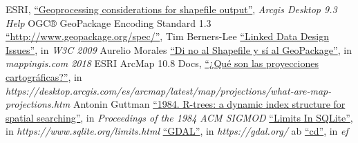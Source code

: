 \begin{thebibliography}{99}
     ESRI, 
        \href{http://webhelp.esri.com/arcgisdesktop/9.3/index.cfm?TopicName=Geoprocessing\%20considerations\%20for\%20shapefile\%20output}{``Geoprocessing considerations for shapefile output''},
        \textit{Arcgis Desktop 9.3 Help}
    OGC® GeoPackage Encoding Standard 1.3
        \href{http://www.geopackage.org/spec/}{``http://www.geopackage.org/spec/''},
     Tim Berners-Lee 
        \href{https://www.w3.org/DesignIssues/LinkedData.html}{``Linked Data Design Issues''},
        in \textit{W3C 2009}
     Aurelio Morales
        \href{https://mappinggis.com/2018/08/di-no-al-shapefile-y-si-al-geopackage/}{``Di no al Shapefile y sí al GeoPackage''},
        in \textit{mappingis.com 2018}
     ESRI ArcMap 10.8 Docs,
        \href{https://desktop.arcgis.com/es/arcmap/latest/map/projections/what-are-map-projections.htm}{``¿Qué son las proyecciones cartográficas?''},
        in \textit{https://desktop.arcgis.com/es/arcmap/latest/map/projections/what-are-map-projections.htm}
     Antonin Guttman
        \href{https://dl.acm.org/doi/10.1145/602259.602266}{``1984. R-trees: a dynamic index structure for spatial searching''},
        in \textit{Proceedings of the 1984 ACM SIGMOD }
        \href{https://www.sqlite.org/limits.html}{``Limits In SQLite''},
        in \textit{https://www.sqlite.org/limits.html}
        \href{https://gdal.org/}{``GDAL''},
        in \textit{https://gdal.org/}
    ab
        \href{}{``cd''},
        in \textit{ef}



\end{thebibliography}
